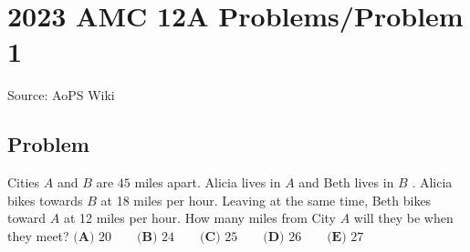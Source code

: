 \documentclass[12pt]{article}
\begin{document}
\section*{{2023 AMC 12A Problems/Problem 1}}
Source: AoPS Wiki

\subsection*{Problem}
Cities $A$ and $B$ are $45$ miles apart. Alicia lives in $A$ and Beth lives in $B$ . Alicia bikes towards $B$ at 18 miles per hour. Leaving at the same time, Beth bikes toward $A$ at 12 miles per hour. How many miles from City $A$ will they be when they meet? $\textbf{(A) }20\qquad\textbf{(B) }24\qquad\textbf{(C) }25\qquad\textbf{(D) }26\qquad\textbf{(E) }27$
\end{document}
